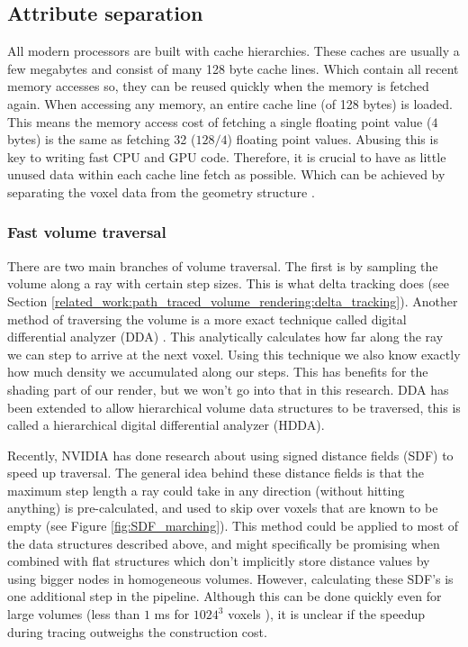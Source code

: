 \clearpage\subsection{Attribute separation} \label{related_work:attribute_separation}
All modern processors are built with cache hierarchies. These caches are usually a few megabytes and consist of many 128 byte cache lines. Which contain all recent memory accesses so, they can be reused quickly when the memory is fetched again. When accessing any memory, an entire cache line (of 128 bytes) is loaded. This means the memory access cost of fetching a single floating point value ($4$ bytes) is the same as fetching 32 ($128/4$) floating point values. Abusing this is key to writing fast CPU and GPU code. Therefore, it is crucial to have as little unused data within each cache line fetch as possible. Which can be achieved by separating the voxel data from the geometry structure \cite{dado2016geometry}.
\subsubsection{Fast volume traversal} \label{related_work:attribute_separation:fast_volume_traversal}
There are two main branches of volume traversal. The first is by sampling the volume along a ray with certain step sizes. This is what delta tracking does (see Section \ref{related_work:path_traced_volume_rendering:delta_tracking}). Another method of traversing the volume is a more exact technique called digital differential analyzer (DDA) \cite{amanatides1987fast}. This analytically calculates how far along the ray we can step to arrive at the next voxel. Using this technique we also know exactly how much density we accumulated along our steps. This has benefits for the shading part of our render, but we won't go into that in this research. DDA has been extended to allow hierarchical volume data structures to be traversed, this is called a hierarchical digital differential analyzer (HDDA)\cite{laine2010efficient}.


Recently, NVIDIA has done research about using signed distance fields (SDF) to speed up traversal\cite{soderlund2022ray}. The general idea behind these distance fields is that the maximum step length a ray could take in any direction (without hitting anything) is pre-calculated, and used to skip over voxels that are known to be empty (see Figure \ref{fig:SDF_marching}). This method could be applied to most of the data structures described above, and might specifically be promising when combined with flat structures which don't implicitly store distance values by using bigger nodes in homogeneous volumes. However, calculating these SDF's is one additional step in the pipeline. Although this can be done quickly even for large volumes (less than $1$ ms for $1024^3$ voxels \cite{cao2010parallel}), it is unclear if the speedup during tracing outweighs the construction cost.
